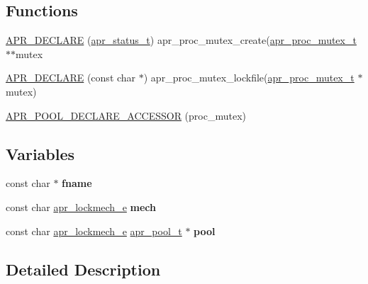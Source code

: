 \subsection*{Functions}
\begin{DoxyCompactItemize}
\item 
\mbox{\hyperlink{group__apr__proc__mutex_ga68b3c38e414c0f369d573694c3923326}{A\+P\+R\+\_\+\+D\+E\+C\+L\+A\+RE}} (\mbox{\hyperlink{group__apr__errno_gaf76ee4543247e9fb3f3546203e590a6c}{apr\+\_\+status\+\_\+t}}) apr\+\_\+proc\+\_\+mutex\+\_\+create(\mbox{\hyperlink{structapr__proc__mutex__t}{apr\+\_\+proc\+\_\+mutex\+\_\+t}} $\ast$$\ast$mutex
\item 
\mbox{\hyperlink{group__apr__proc__mutex_ga6c075452682e5c1427107a9e1e21530a}{A\+P\+R\+\_\+\+D\+E\+C\+L\+A\+RE}} (const char $\ast$) apr\+\_\+proc\+\_\+mutex\+\_\+lockfile(\mbox{\hyperlink{structapr__proc__mutex__t}{apr\+\_\+proc\+\_\+mutex\+\_\+t}} $\ast$mutex)
\item 
\mbox{\hyperlink{group__apr__proc__mutex_gacfbfc453323a4f81b12d537f9d0a3df3}{A\+P\+R\+\_\+\+P\+O\+O\+L\+\_\+\+D\+E\+C\+L\+A\+R\+E\+\_\+\+A\+C\+C\+E\+S\+S\+OR}} (proc\+\_\+mutex)
\end{DoxyCompactItemize}
\subsection*{Variables}
\begin{DoxyCompactItemize}
\item 
\mbox{\label{group__apr__proc__mutex_ga6a2fc0c236288b07ce5bd1335ca89fa2}} 
const char $\ast$ {\bfseries fname}
\item 
\mbox{\label{group__apr__proc__mutex_gac5f6e658672b8579da569b97a6ae82a2}} 
const char \mbox{\hyperlink{group__apr__proc__mutex_ga75dd95a48a1e855a87b509b522746ed4}{apr\+\_\+lockmech\+\_\+e}} {\bfseries mech}
\item 
\mbox{\label{group__apr__proc__mutex_ga51fbc0d90e2519e2e42e03c5dd9f441b}} 
const char \mbox{\hyperlink{group__apr__proc__mutex_ga75dd95a48a1e855a87b509b522746ed4}{apr\+\_\+lockmech\+\_\+e}} \mbox{\hyperlink{group__apr__pools_gaf137f28edcf9a086cd6bc36c20d7cdfb}{apr\+\_\+pool\+\_\+t}} $\ast$ {\bfseries pool}
\end{DoxyCompactItemize}


\subsection{Detailed Description}


